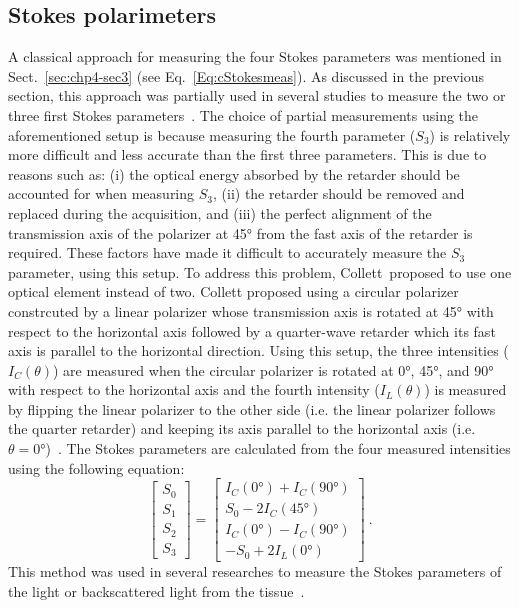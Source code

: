 \subsection{Stokes polarimeters}
A classical approach for measuring the four Stokes parameters was mentioned in Sect.~\ref{sec:chp4-sec3} (see Eq.~\ref{Eq:cStokesmeas}). 
As discussed in the previous section, this approach was partially used in several studies to measure the two or three first Stokes parameters~\cite{tchvialeva2013polarization,zhao2009,Jacques12175282,Anastasiadou2008}.
The choice of partial measurements using the aforementioned setup is because measuring the fourth parameter ($S_{3}$) is relatively more difficult and less accurate than the first three parameters.
This is due to reasons such as: (i) the optical energy absorbed by the retarder should be accounted for when measuring $S_{3}$, (ii) the retarder should be removed and replaced during the acquisition, and  (iii) the perfect alignment of the transmission axis of the polarizer at \ang{45} from the fast axis of the retarder is required.
These factors have made it difficult to accurately measure the $S_{3}$ parameter, using this setup.
To address this problem, Collett\,\cite{collett1984measurement} proposed to use one optical element instead of two.
Collett proposed using a circular polarizer constrcuted by a linear polarizer whose transmission axis is rotated at \ang{45} with respect to the horizontal axis followed by a quarter-wave retarder which its fast axis is parallel to the horizontal direction. 
Using this setup, the three intensities ($I_{C}(\theta)$) are measured when the circular polarizer is rotated at \ang{0}, \ang{45}, and \ang{90} with respect to the horizontal axis and the fourth intensity ($I_{L}(\theta)$) is measured by flipping the linear polarizer to the other side (i.e. the linear polarizer follows the quarter retarder) and keeping its axis parallel to the horizontal axis (i.e. $\theta = \ang{0}$)~\cite{collett1984measurement,ghosh2011tissue}.
The Stokes parameters are calculated from the four measured intensities using the following equation:
\begin{equation}\label{eq:CollettStokes}
\begin{bmatrix}
S_{0} \\ S_{1} \\ S_{2} \\ S_{3} 
\end{bmatrix} = 
\begin{bmatrix}
I_{C}(\ang{0}) + I_{C}(\ang{90}) \\
S_{0} - 2I_{C}(\ang{45}) \\
I_{C}(\ang{0}) - I_{C}(\ang{90})\\
-S_{0} +2I_{L}(\ang{0})
\end{bmatrix}~.
\end{equation}
\noindent This method was used in several researches to measure the Stokes parameters of the light or backscattered light from the tissue~\cite{sankaran1999polarization, ghosh2004depolarization}.

